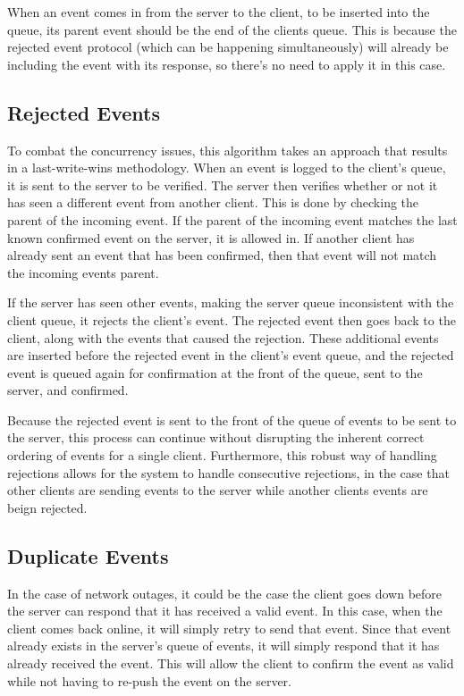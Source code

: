 When an event comes in from the server to the client, to be inserted into the queue, its parent event should be the end of the clients queue. This is because the rejected event protocol (which can be happening simultaneously) will already be including the event with its response, so there's no need to apply it in this case. 

\subsection{Rejected Events}

To combat the concurrency issues, this algorithm takes an approach that results in a last-write-wins methodology. When an event is logged to the client’s queue, it is sent to the server to be verified. The server then verifies whether or not it has seen a different event from another client. This is done by checking the parent of the incoming event. If the parent of the incoming event matches the last known confirmed event on the server, it is allowed in. If another client has already sent an event that has been confirmed, then that event will not match the incoming events parent.

If the server has seen other events, making the server queue inconsistent with the client queue, it rejects the client's event. The rejected event then goes back to the client, along with the events that caused the rejection. These additional events are inserted before the rejected event in the client's event queue, and the rejected event is queued again for confirmation at the front of the queue, sent to the server, and confirmed. 

Because the rejected event is sent to the front of the queue of events to be sent to the server, this process can continue without disrupting the inherent correct ordering of events for a single client. Furthermore, this robust way of handling rejections allows for the system to handle consecutive rejections, in the case that other clients are sending events to the server while another clients events are beign rejected.

\subsection{Duplicate Events}

In the case of network outages, it could be the case the client goes down before the server can respond that it has received a valid event. In this case, when the client comes back online, it will simply retry to send that event. Since that event already exists in the server’s queue of events, it will simply respond that it has already received the event. This will allow the client to confirm the event as valid while not having to re-push the event on the server.


